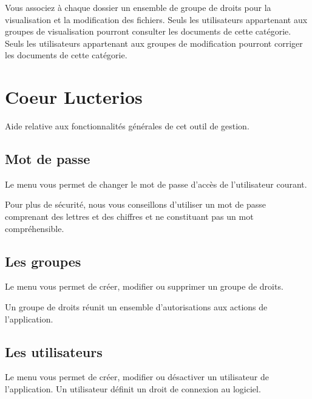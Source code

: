 \documentclass[letterpaper,10pt,french]{sphinxmanual}
\begin{document}
Vous associez à chaque dossier un ensemble de groupe de droits pour la visualisation et la modification des fichiers. Seuls les utilisateurs appartenant aux groupes de visualisation pourront consulter les documents de cette catégorie. Seuls les utilisateurs appartenant aux groupes de modification pourront corriger les documents de cette catégorie.


\chapter{Coeur Lucterios}
\label{\detokenize{CORE/index:coeur-lucterios}}\label{\detokenize{CORE/index::doc}}
Aide relative aux fonctionnalités générales de cet outil de gestion.


\section{Mot de passe}
\label{\detokenize{CORE/password:mot-de-passe}}\label{\detokenize{CORE/password::doc}}
Le menu  vous permet de changer le mot de passe d’accès de l’utilisateur courant.

\noindent{}

Pour plus de sécurité, nous vous conseillons d’utiliser un mot de passe comprenant des lettres et des chiffres et ne constituant pas un mot compréhensible.


\section{Les groupes}
\label{\detokenize{CORE/groups:les-groupes}}\label{\detokenize{CORE/groups::doc}}
Le menu  vous permet de créer, modifier ou supprimer un groupe de droits.

\noindent{}

Un groupe de droits réunit un ensemble d’autorisations aux actions de l’application.

\noindent{}


\section{Les utilisateurs}
\label{\detokenize{CORE/users:les-utilisateurs}}\label{\detokenize{CORE/users::doc}}
Le menu  vous
permet de créer, modifier ou désactiver un utilisateur de l’application. Un
utilisateur définit un droit de connexion au logiciel.
\end{document}
